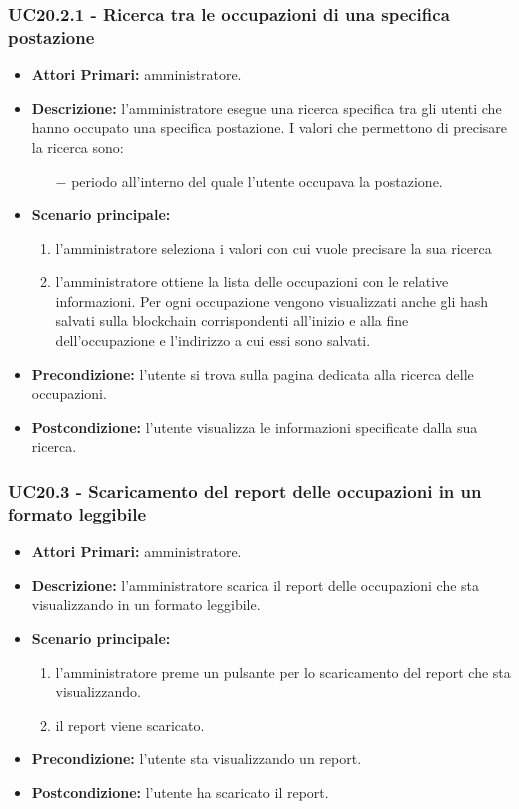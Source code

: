 \subsubsection{ UC20.2.1 - Ricerca tra le occupazioni di una specifica postazione}
\begin{itemize}
	\item\textbf{Attori Primari:} 
	amministratore.
	\item\textbf{Descrizione:} 
	l'amministratore esegue una ricerca specifica tra gli utenti che hanno occupato una specifica postazione.
	I valori che permettono di precisare la ricerca sono:
	\begin{itemize}
		\item[$-$] periodo all'interno del quale l'utente occupava la postazione.
	\end{itemize}
	\item\textbf{Scenario principale:} 
	\begin{enumerate}
		\item l'amministratore seleziona i valori con cui vuole precisare la sua ricerca
		\item l'amministratore ottiene la lista delle occupazioni con le relative informazioni. Per ogni occupazione vengono visualizzati anche gli hash salvati sulla blockchain corrispondenti all'inizio e alla fine dell'occupazione e l'indirizzo a cui essi sono salvati.
	\end{enumerate}
	\item\textbf{Precondizione:} 
	l'utente si trova sulla pagina dedicata alla ricerca delle occupazioni.
	\item\textbf{Postcondizione:}
	l'utente visualizza le informazioni specificate dalla sua ricerca.
\end{itemize}

\subsubsection{ UC20.3 - Scaricamento del report delle occupazioni in un formato leggibile}
\begin{itemize}
	\item\textbf{Attori Primari:} 
	amministratore.
	\item\textbf{Descrizione:} 
	l'amministratore scarica il report delle occupazioni che sta visualizzando in un formato leggibile.
	\item\textbf{Scenario principale:} 
	\begin{enumerate}
		\item l'amministratore preme un pulsante per lo scaricamento del report che sta visualizzando.
		\item il report viene scaricato.
	\end{enumerate}
	\item\textbf{Precondizione:} 
	l'utente sta visualizzando un report.
	\item\textbf{Postcondizione:}
	l'utente ha scaricato il report.
\end{itemize}

